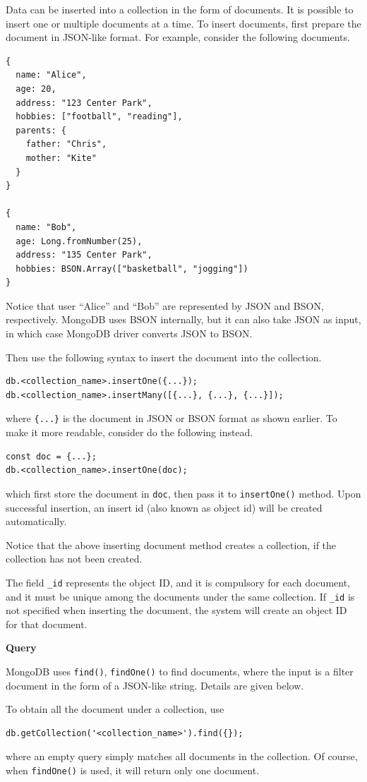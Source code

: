 Data can be inserted into a collection in the form of documents. It is possible to insert one or multiple documents at a time. To insert documents, first prepare the document in JSON-like format. For example, consider the following documents.
\begin{lstlisting}
{
  name: "Alice",
  age: 20,
  address: "123 Center Park",
  hobbies: ["football", "reading"],
  parents: {
    father: "Chris",
    mother: "Kite"
  }
}

{
  name: "Bob",
  age: Long.fromNumber(25),
  address: "135 Center Park",
  hobbies: BSON.Array(["basketball", "jogging"])
}
\end{lstlisting}
Notice that user ``Alice'' and ``Bob'' are represented by JSON and BSON, respectively. MongoDB uses BSON internally, but it can also take JSON as input, in which case MongoDB driver converts JSON to BSON.

Then use the following syntax to insert the document into the collection.
\begin{lstlisting}
db.<collection_name>.insertOne({...});
db.<collection_name>.insertMany([{...}, {...}, {...}]);
\end{lstlisting}
where \verb|{...}| is the document in JSON or BSON format as shown earlier. To make it more readable, consider do the following instead.
\begin{lstlisting}
const doc = {...};
db.<collection_name>.insertOne(doc);
\end{lstlisting}
which first store the document in \verb|doc|, then pass it to \verb|insertOne()| method. Upon successful insertion, an insert id (also known as object id) will be created automatically.

Notice that the above inserting document method creates a collection, if the collection has not been created.

The field \verb|_id| represents the object ID, and it is compulsory for each document, and it must be unique among the documents under the same collection. If \verb|_id| is not specified when inserting the document, the system will create an object ID for that document. 

\vspace{0.1in}
\noindent \textbf{Query}
\vspace{0.1in}

MongoDB uses \verb|find()|, \verb|findOne()| to find documents, where the input is a filter document in the form of a JSON-like string. Details are given below.

To obtain all the document under a collection, use
\begin{lstlisting}
db.getCollection('<collection_name>').find({});
\end{lstlisting}
where an empty query simply matches all documents in the collection. Of course, when \verb|findOne()| is used, it will return only one document.

